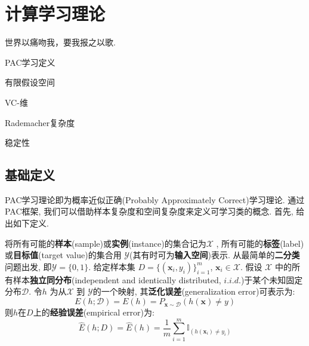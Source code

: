 \chapter{\quad 计算学习理论}
\begin{center}
    \textcolor[RGB]{255, 0, 0}{\faHeart}世界以痛吻我，要我报之以歌.\textcolor[RGB]{255, 0, 0}{\faHeart}
\end{center}
\vspace{-5pt}
\begin{center}
\end{center}

\begin{introduction}
  \item PAC学习定义
  \item 有限假设空间
  \item VC-维
  \item Rademacher复杂度
  \item 稳定性
\end{introduction}

\section{基础定义}

PAC学习理论即为概率近似正确(Probably Approximately Correct)学习理论. 通过PAC框架, 我们可以借助样本复杂度和空间复杂度来定义可学习类的概念. 首先, 给出如下定义.

将所有可能的\textbf{样本}(sample)或\textbf{实例}(instance)的集合记为$\mathcal{X}$ , 所有可能的\textbf{标签}(label)或\textbf{目标值}(target value)的集合用 $\mathcal{Y}$(其有时可为\textbf{输入空间})表示.  从最简单的\textbf{二分类}问题出发, 即$\mathcal{Y}=\{0,1\}$. 给定样本集 $D=\{(\mathbf{x}_i,y_i)\}_{i=1}^{m}$, $\mathbf{x}_i \in\mathcal{X}$.  假设 $\mathcal{X}$ 中的所有样本\textbf{独立同分布}(independent and identically distributed, $\textit{i.i.d.}$)于某个未知固定分布$\mathcal{D}$.  令$h$ 为从$\mathcal{X}$ 到 $\mathcal{Y}$的一个映射, 其\textbf{泛化误差}(generalization error)可表示为:
\begin{equation}
E\left( h; \mathcal{D} \right) =E\left( h \right) =  P_{\mathbf{x} \sim \mathcal{D} } \left( h\left( \mathbf{x} \right) \ne y \right)
\end{equation}
则$h$在$D$上的\textbf{经验误差}(empirical error)为:
\begin{equation}
\hat{E}\left( h;D \right) =\hat{E}\left( h \right)=\frac{1}{m}\sum_{i=1}^m{\mathbb{I}_{\left( h\left( \mathbf{x}_i \right) \ne y_i \right)}}
\end{equation}

